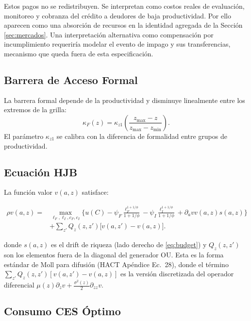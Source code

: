 \documentclass[12pt]{article}
\newcommand{\dVa}{\partial_a v}
\begin{document}
Estos pagos no se redistribuyen. Se interpretan como costos reales de evaluación, monitoreo y cobranza del crédito a deudores de baja productividad. Por ello aparecen como una absorción de recursos en la identidad agregada de la Sección \ref{sec:mercados}. Una interpretación alternativa como compensación por incumplimiento requeriría modelar el evento de impago y sus transferencias, mecanismo que queda fuera de esta especificación.

\subsection{Barrera de Acceso Formal}\label{sec:kappa}

La barrera formal depende de la productividad y disminuye linealmente entre los extremos de la grilla:
\begin{equation}\label{eq:kappa_z}
\kappa_F(z)=\kappa_{z1}\left(\frac{z_{\max}-z}{z_{\max}-z_{\min}}\right).
\end{equation}
El parámetro $\kappa_{z1}$ se calibra con la diferencia de formalidad entre grupos de productividad.

\subsection{Ecuación HJB}

La función valor $v(a,z)$ satisface:

\begin{equation}\label{eq:HJB}
\begin{aligned}
\rho v(a,z)={}&\max_{\ell_F,\ell_I,c_F,c_I}\Bigg\{
u(C)-\psi_F\frac{\ell_F^{1+1/\phi}}{1+1/\phi}
-\psi_I\frac{\ell_I^{1+1/\phi}}{1+1/\phi}
+\dVa v(a,z)s(a,z)\Bigg\}\\
&+\sum_{z'}Q_z(z,z')\big[v(a,z')-v(a,z)\big].
\end{aligned}
\end{equation}

donde $s(a,z)$ es el drift de riqueza (lado derecho de \ref{eq:budget}) y $Q_z(z,z')$ son los elementos fuera de la diagonal del generador OU. Esta es la forma estándar de Moll para difusión (HACT Apéndice Ec.~28), donde el término $\sum_{z'} Q_z(z,z') [v(a,z') - v(a,z)]$ es la versión discretizada del operador diferencial $\mu(z)\partial_z v + \frac{\sigma^2(z)}{2}\partial_{zz}v$.

\subsection{Consumo CES Óptimo}\label{sec:ces}
\end{document}
